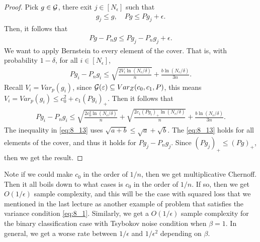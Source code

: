 \documentclass[twoside]{article}
\begin{document}
\begin{proof}
Pick $g \in \mathcal{G}$, there exit $j \in [N_\epsilon]$ such that 
\begin{align}
    g_j \leq g, \quad Pg \leq P g_j + \epsilon.
\end{align}
Then, it follows that
\begin{align}
    Pg - P_n g \leq P g_j - P_n g_j + \epsilon.
\end{align}
We want to apply Bernstein to every element of the cover.  That is, with probability $1-\delta$, for all $i \in [N_\epsilon]$,
\begin{align}
    P g_i - P_n g_i \leq \sqrt{\frac{2 V_i \ln(N_\epsilon/\delta)}{n}} + \frac{b \ln(N_\epsilon/\delta)}{3n}.
\end{align}
Recall $V_i = Var_p(g_i)$, since $\mathcal{G}(\varepsilon) \subseteq Var_Z(c_0, c_1, P)$, this means $V_i = Var_p(g_i) \leq c_0^2 + c_1 ( P g_i)_{+}$.  Then it follows that 
\begin{align}
    P g_i - P_n g_i \leq \sqrt{\frac{2 c_0^2 \ln(N_\epsilon/\delta)}{n}} + \sqrt{\frac{2 c_1 (P g_i)_+ \ln(N_\epsilon/\delta)}{n}} + \frac{b \ln(N_\epsilon/\delta)}{3n}. \label{eq:8_13}
\end{align}
The inequality in \cref{eq:8_13} uses $\sqrt{a + b} \leq \sqrt{a} + \sqrt{b}$. 
The \cref{eq:8_13} holds for all elements of the cover, and thus it holds for $Pg_j - P_n g_j$.  Since $(P g_j)_{+} \leq (P g)_{+}$, then we get the result.
\end{proof}

Note if we could make $c_0$ in the order of $1/n$, then we get multiplicative Chernoff.  Then it all boils down to what cases is $c_0$ in the order of $1/n$.  If so, then we get $O(1/\epsilon)$ sample complexity, and this will be the case with squared loss that we mentioned in the last lecture as another example of problem that satisfies the variance condition \cref{eq:8_1}.  Similarly, we get a $O(1/\epsilon)$ sample complexity for the binary classification case with Tsybokov noise condition when $\beta = 1$.  In general, we get a worse rate between $1/\epsilon$ and $1/\epsilon^2$ depending on $\beta$. 
\end{document}
